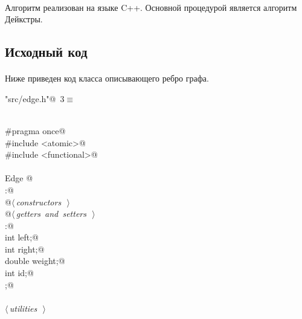 \documentclass[12pt]{article}
\begin{document}
\paragraph{}
Алгоритм реализован на языке C++. Основной процедурой является
алгоритм Дейкстры\cite{dijkstra}.


\subsection{Исходный код}
\paragraph{}
Ниже приведен код класса описывающего ребро графа.
\begin{flushleft} \small
\begin{minipage}{\linewidth}\label{scrap1}\raggedright\small
{} \verb@"src/edge.h"@\nobreak\ {\footnotesize {3}}$\equiv$
\vspace{-1ex}
\begin{list}{}{} \item
\mbox{}\verb@@\\
\mbox{}\verb@#pragma once@\\
\mbox{}\verb@#include <atomic>@\\
\mbox{}\verb@#include <functional>@\\
\mbox{}\verb@@\\
\mbox{}\verb@class Edge {@\\
\mbox{}\verb@public:@\\
\mbox{}\verb@    @\hbox{$\langle\,${\itshape constructors}\nobreak\ {\footnotesize {}}$\,\rangle$}\verb@@\\
\mbox{}\verb@    @\hbox{$\langle\,${\itshape getters and setters}\nobreak\ {\footnotesize {}}$\,\rangle$}\verb@@\\
\mbox{}\verb@private:@\\
\mbox{}\verb@    int left;@\\
\mbox{}\verb@    int right;@\\
\mbox{}\verb@    double weight;@\\
\mbox{}\verb@    int id;@\\
\mbox{}\verb@};@\\
\mbox{}\verb@@\\
\mbox{}\verb@@\hbox{$\langle\,${\itshape utilities}\nobreak\ {\footnotesize {}}$\,\rangle$}\verb@@\\
\mbox{}\verb@@\\
\mbox{}\verb@@{\NWsep}
\end{list}
\vspace{-1.5ex}
\footnotesize
\begin{list}{}{\setlength{\itemsep}{-\parsep}\setlength{\itemindent}{-\leftmargin}}

\item{}
\end{list}
\end{minipage}\vspace{4ex}
\end{flushleft}
\end{document}
